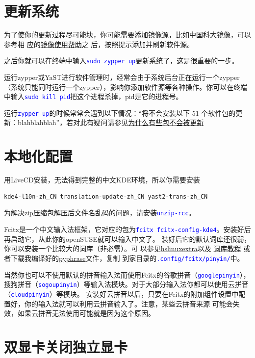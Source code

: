 \documentclass[12pt,openany]{book}
\newcommand{\command}[1]{\texttt{\textcolor{blue}{#1}}}
\newcommand{\zy}{zypper或YaST}
\newcommand{\soft}[1]{\texttt{\textcolor{blue}{#1}}}
\begin{document}
\section{更新系统}
为了使你的更新过程尽可能块，你可能需要添加镜像源，比如中国科大镜像，可以参考相
应的\href{https://lug.ustc.edu.cn/wiki/mirrors/help/opensuse}{镜像使用帮助}之
后，按照提示添加并刷新软件源。

之后你就可以在终端中输入\command{sudo zypper up}更新系统了，这是很重要的一步。

运行\zy 进行软件管理时，经常会由于系统后台正在运行一个zypper（系统只能同时运行一个zypper），影响你添加软件源等各种操作。你可以在终端中输入\command{sudo kill pid}把这个进程杀掉，pid是它的进程号。

运行\command{zypper up}的时候常常会遇到以下情况：“将不会安装以下 51 个软件包的更新：blahblahblah”，若对此有疑问请参见\href{https://forum.suse.org.cn/viewtopic.php?t=2777&p=21896}{为什么有些包不会被更新}
\section{本地化配置}
用LiveCD安装，无法得到完整的中文KDE环境，所以你需要安装
\begin{Verbatim}[formatcom=\color{codecolor}]
    kde4-l10n-zh_CN translation-update-zh_CN yast2-trans-zh_CN
\end{Verbatim}

为解决zip压缩包解压后文件名乱码的问题，请安装\soft{unzip-rcc}。

Fcitx是一个中文输入法框架，它对应的包为\soft{fcitx fcitx-config-kde4}。安装好后再启动它，从此你的openSUSE就可以输入中文了。
装好后它的默认词库还很弱，你可以安装一个比较大的词库（非必需）。可%
以参见\href{https://code.google.com/p/hslinuxextra/}{hs\-linux\-extra}以及%
\href{https://www.librehat.com/fcitx-sogou-pinyin-cell-database-convert-import-guide/}{词库教程}%
或者下载我编译好的\href{http://pan.baidu.com/s/1i3HtJ4T}{pyphrase}文件，复制
到家目录的\command{.config/fcitx/pinyin/}中。

当然你也可以不使用默认的拼音输入法而使用Fcitx的谷歌拼音（\soft{goo\-gle\-pin\-yin}），
搜狗拼音（\soft{so\-gou\-pin\-yin}）等输入法模块。对于大部分输入法你都可以使用云拼音（\soft{cloud\-pin\-yin}）等模块。
安装好云拼音以后，只要在Fcitx的附加组件设置中配置好，你的输入法就可以利用云拼音输入了。注意，某些云拼音来源
可能会失效，如果云拼音无法使用可能就是因为这个原因。
\section[双显卡]{双显卡关闭独立显卡}
\end{document}
